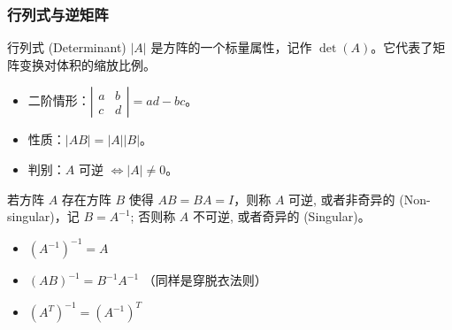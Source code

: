 \begin{frame}
\frametitle{行列式与逆矩阵}

\begin{block}{行列式 (Determinant)}
$|A|$ 是方阵的一个标量属性，记作 $\det(A)$。它代表了矩阵变换对体积的缩放比例。
\begin{itemize}
    \item 二阶情形：$\left| \begin{smallmatrix} a & b \\ c & d \end{smallmatrix} \right| = ad - bc$。
    \item 性质：$|AB| = |A||B|$。
    \item 判别：$A$ 可逆 $\iff |A| \neq 0$。
\end{itemize}
\end{block}

\pause

\begin{Def}[逆矩阵]
若方阵 $A$ 存在方阵 $B$ 使得 $AB = BA = I$，则称 $A$ 可逆, 或者非奇异的 (Non-singular)，记 $B = A^{-1}$; 否则称 $A$ 不可逆, 或者奇异的 (Singular)。
\end{Def}

\begin{prop}[逆矩阵的性质]
\begin{itemize}
    \item $(A^{-1})^{-1} = A$
    \item $(AB)^{-1} = B^{-1} A^{-1}$ （同样是穿脱衣法则）
    \item $(A^T)^{-1} = (A^{-1})^T$
\end{itemize}
\end{prop}

\end{frame}


